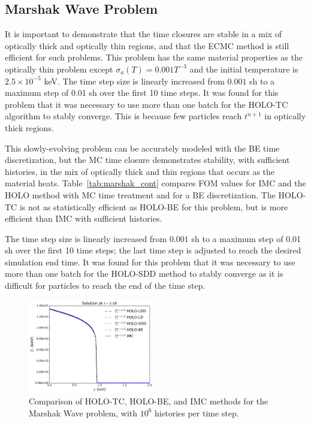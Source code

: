 \documentclass{anstrans}
\begin{document}
\subsection{Marshak Wave Problem}

It is important to demonstrate that the time closures are stable in a mix of optically
thick and optically thin regions, and that the ECMC method is still efficient for such
problems.  This problem has the same material properties as the optically thin problem except
$\sigma_a(T) = 0.001 T^{-3}$ and the initial temperature is $2.5\times10^{-5}$ keV.  The time step size is linearly increased from $0.001$ sh to a
maximum step of 0.01 sh over the first 10 time steps.  It was found for this problem that it was
necessary to use more than one batch for the HOLO-TC algorithm to stably converge.
This is because few particles reach $t^{n+1}$ in optically
thick regions.

 This slowly-evolving problem can be accurately modeled with
the BE time
discretization, but the MC time closure demonstrates stability, with sufficient histories, in the mix of optically thick
and thin regions that occurs as the material heats.  
Table~\ref{tab:marshak_cont} compares FOM values for IMC and the HOLO method with MC time treatment and for a BE discretization. The HOLO-TC is not as statistically
efficient as HOLO-BE for this problem, but is more efficient than IMC with
sufficient histories.  

The time step size is linearly increased from $0.001$ sh to a
maximum step of 0.01 sh over the first 10 time steps; the last time step is adjusted to
reach the desired simulation end time.  It was found for this problem that it was
necessary to use more than one batch for the HOLO-SDD method to stably converge as it is difficult
for particles to reach the end of the time step.  
\begin{figure}[H]
    \centering
    \includegraphics[width=0.49\textwidth]{marshak_time_cont_compare.pdf}
    \caption{\label{fig:marshak_tc} Comparison of HOLO-TC, HOLO-BE, and IMC methods for
the Marshak Wave problem, with $10^6$ histories per time step.}
\end{figure}
\end{document}
